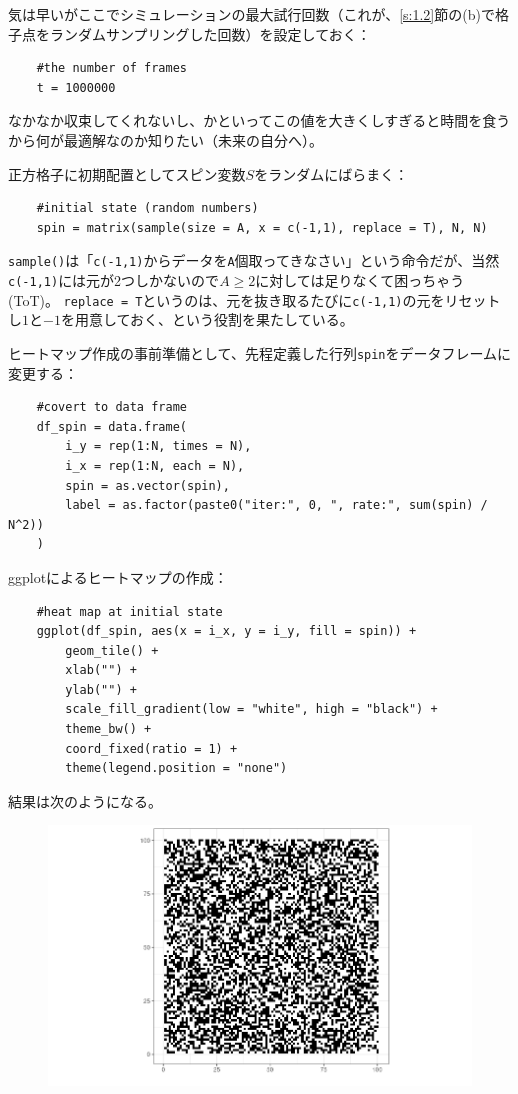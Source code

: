\documentclass[fontsize = 12pt]{jlreq}
\begin{document}
気は早いがここでシミュレーションの最大試行回数（これが、\ref{s:1.2}節の(b)で格子点をランダムサンプリングした回数）を設定しておく：
\begin{lstlisting}
    #the number of frames
    t = 1000000
\end{lstlisting}
なかなか収束してくれないし、かといってこの値を大きくしすぎると時間を食うから何が最適解なのか知りたい（未来の自分へ）。

正方格子に初期配置としてスピン変数$S$をランダムにばらまく：
\begin{lstlisting}
    #initial state (random numbers)
    spin = matrix(sample(size = A, x = c(-1,1), replace = T), N, N)
\end{lstlisting}
\texttt{sample()}は「\texttt{c(-1,1)}からデータを\texttt{A}個取ってきなさい」という命令だが、当然\texttt{c(-1,1)}には元が2つしかないので$A \ge 2$に対しては足りなくて困っちゃう(ToT)。
\texttt{replace = T}というのは、元を抜き取るたびに\texttt{c(-1,1)}の元をリセットし$1$と$-1$を用意しておく、という役割を果たしている。

ヒートマップ作成の事前準備として、先程定義した行列\texttt{spin}をデータフレームに変更する：
\begin{lstlisting}
    #covert to data frame
    df_spin = data.frame(
        i_y = rep(1:N, times = N), 
        i_x = rep(1:N, each = N), 
        spin = as.vector(spin), 
        label = as.factor(paste0("iter:", 0, ", rate:", sum(spin) / N^2))
    )
\end{lstlisting}
ggplotによるヒートマップの作成：
\begin{lstlisting}
    #heat map at initial state
    ggplot(df_spin, aes(x = i_x, y = i_y, fill = spin)) +
        geom_tile() +
        xlab("") +
        ylab("") +
        scale_fill_gradient(low = "white", high = "black") +
        theme_bw() +
        coord_fixed(ratio = 1) +
        theme(legend.position = "none")
\end{lstlisting}
結果は次のようになる。
\begin{figure}[H] 
    \centering 
    \includegraphics[width=15cm]{f1.png}
\end{figure}%
\end{document}
